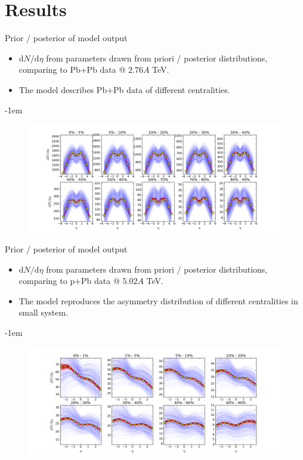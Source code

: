 \documentclass[11pt]{beamer}
\begin{document}

\section{Results}
\begin{frame}{Prior / posterior of model output}
\begin{itemize}
\item $\mathrm{d}N/\mathrm{d}\eta$ from parameters drawn from priori / posterior distributions, comparing to Pb+Pb data @ $2.76A$ TeV. 
\item The model describes Pb+Pb data of different centralities.
\end{itemize}
\kern-1em
\begin{figure}
\begin{center}
\includegraphics[width = \textwidth]{./pics/pri-post-PbPb.png}
\end{center}
\end{figure}
\end{frame}

\begin{frame}{Prior / posterior of model output}
\begin{itemize}
\item $\mathrm{d}N/\mathrm{d}\eta$ from parameters drawn from priori / posterior distributions, comparing to p+Pb data @ $5.02A$ TeV. 
\item The model reproduces the asymmetry distribution of different centralities in small system.
\end{itemize}
\kern-1em
\begin{figure}
\begin{center}
\includegraphics[width = \textwidth]{./pics/pri-post-pPb.png}
\end{center}
\end{figure}
\end{frame}
\end{document}
